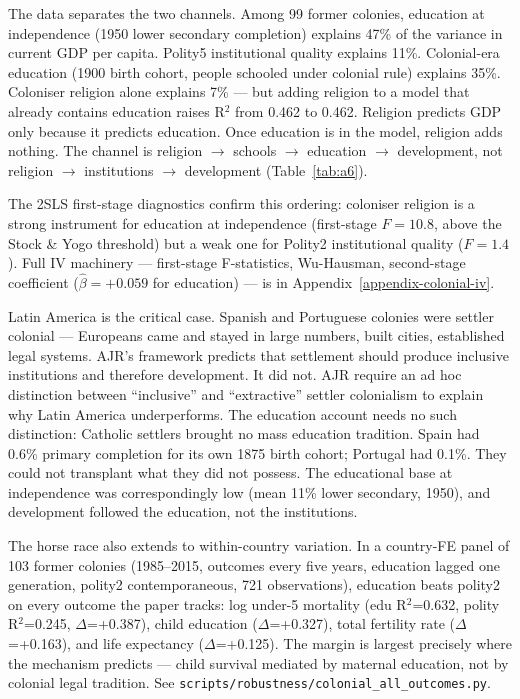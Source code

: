 \documentclass[12pt,letterpaper]{article}
\begin{document}
The data separates the two channels. Among 99 former colonies, education
at independence (1950 lower secondary completion) explains 47\% of the
variance in current GDP per capita. Polity5 institutional quality
explains 11\%. Colonial-era education (1900 birth cohort, people
schooled under colonial rule) explains 35\%. Coloniser religion alone
explains 7\% --- but adding religion to a model that already contains
education raises R$^2$ from 0.462 to 0.462. Religion predicts GDP only
because it predicts education. Once education is in the model, religion
adds nothing. The channel is religion $\to$ schools $\to$ education $\to$
development, not religion $\to$ institutions $\to$ development (Table~\ref{tab:a6}).

The 2SLS first-stage diagnostics confirm this ordering: coloniser
religion is a strong instrument for education at independence
(first-stage $F=10.8$, above the Stock \& Yogo threshold) but a weak
one for Polity2 institutional quality ($F=1.4$). Full IV machinery ---
first-stage F-statistics, Wu-Hausman, second-stage coefficient
($\hat\beta=+0.059$ for education) --- is in Appendix~\ref{appendix-colonial-iv}.

Latin America is the critical case. Spanish and Portuguese colonies were
settler colonial --- Europeans came and stayed in large numbers, built
cities, established legal systems. AJR's framework predicts that
settlement should produce inclusive institutions and therefore
development. It did not. AJR require an ad hoc distinction between
``inclusive'' and ``extractive'' settler colonialism to explain why Latin
America underperforms. The education account needs no such distinction:
Catholic settlers brought no mass education tradition. Spain had 0.6\%
primary completion for its own 1875 birth cohort; Portugal had 0.1\%.
They could not transplant what they did not possess. The educational
base at independence was correspondingly low (mean 11\% lower secondary,
1950), and development followed the education, not the institutions.

The horse race also extends to within-country variation. In a
country-FE panel of 103 former colonies (1985--2015, outcomes every
five years, education lagged one generation, polity2 contemporaneous,
721 observations), education beats polity2 on every outcome the
paper tracks: log under-5 mortality (edu R$^2$=0.632, polity
R$^2$=0.245, $\Delta$=+0.387), child education ($\Delta$=+0.327),
total fertility rate ($\Delta$=+0.163), and life expectancy
($\Delta$=+0.125). The margin is largest precisely where the
mechanism predicts --- child survival mediated by maternal
education, not by colonial legal tradition.
See \texttt{scripts/robustness/colonial\_all\_outcomes.py}.
\end{document}
